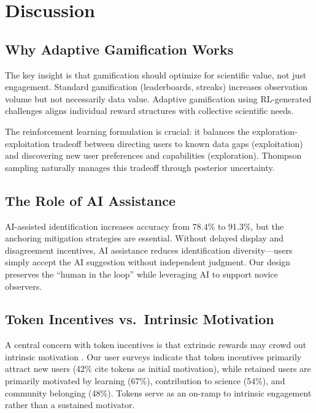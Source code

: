 \documentclass[11pt,a4paper]{article}
\begin{document}
\section{Discussion}
\label{sec:discussion}

\subsection{Why Adaptive Gamification Works}

The key insight is that gamification should optimize for scientific value,
not just engagement. Standard gamification (leaderboards, streaks)
increases observation volume but not necessarily data value. Adaptive
gamification using RL-generated challenges aligns individual reward
structures with collective scientific needs.

The reinforcement learning formulation is crucial: it balances the
exploration-exploitation tradeoff between directing users to known data
gaps (exploitation) and discovering new user preferences and capabilities
(exploration). Thompson sampling naturally manages this tradeoff through
posterior uncertainty.

\subsection{The Role of AI Assistance}

AI-assisted identification increases accuracy from 78.4\% to 91.3\%,
but the anchoring mitigation strategies are essential. Without delayed
display and disagreement incentives, AI assistance reduces identification
diversity---users simply accept the AI suggestion without independent
judgment. Our design preserves the ``human in the loop'' while leveraging
AI to support novice observers.

\subsection{Token Incentives vs.\ Intrinsic Motivation}

A central concern with token incentives is that extrinsic rewards may
crowd out intrinsic motivation \citep{deci1999meta}. Our user surveys
indicate that token incentives primarily attract new users (42\% cite
tokens as initial motivation), while retained users are primarily
motivated by learning (67\%), contribution to science (54\%), and
community belonging (48\%). Tokens serve as an on-ramp to intrinsic
engagement rather than a sustained motivator.
\end{document}
